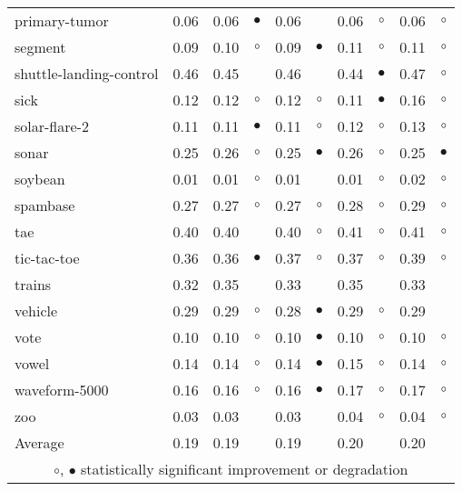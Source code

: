 {\begin{longtable}{lrr@{\hspace{0.1cm}}cr@{\hspace{0.1cm}}cr@{\hspace{0.1cm}}cr@{\hspace{0.1cm}}c}
primary-tumor & 0.06 & 0.06 &  $\bullet$ & 0.06 &            & 0.06 &   $\circ$ & 0.06 &   $\circ$\\
segment & 0.09 & 0.10 &    $\circ$ & 0.09 &  $\bullet$ & 0.11 &   $\circ$ & 0.11 &   $\circ$\\
shuttle-landing-control & 0.46 & 0.45 &            & 0.46 &            & 0.44 & $\bullet$ & 0.47 &   $\circ$\\
sick & 0.12 & 0.12 &    $\circ$ & 0.12 &    $\circ$ & 0.11 & $\bullet$ & 0.16 &   $\circ$\\
solar-flare-2 & 0.11 & 0.11 &  $\bullet$ & 0.11 &    $\circ$ & 0.12 &   $\circ$ & 0.13 &   $\circ$\\
sonar & 0.25 & 0.26 &    $\circ$ & 0.25 &  $\bullet$ & 0.26 &   $\circ$ & 0.25 & $\bullet$\\
soybean & 0.01 & 0.01 &    $\circ$ & 0.01 &            & 0.01 &   $\circ$ & 0.02 &   $\circ$\\
spambase & 0.27 & 0.27 &    $\circ$ & 0.27 &    $\circ$ & 0.28 &   $\circ$ & 0.29 &   $\circ$\\
tae & 0.40 & 0.40 &            & 0.40 &    $\circ$ & 0.41 &   $\circ$ & 0.41 &   $\circ$\\
tic-tac-toe & 0.36 & 0.36 &  $\bullet$ & 0.37 &    $\circ$ & 0.37 &   $\circ$ & 0.39 &   $\circ$\\
trains & 0.32 & 0.35 &            & 0.33 &            & 0.35 &           & 0.33 &          \\
vehicle & 0.29 & 0.29 &    $\circ$ & 0.28 &  $\bullet$ & 0.29 &   $\circ$ & 0.29 &          \\
vote & 0.10 & 0.10 &    $\circ$ & 0.10 &  $\bullet$ & 0.10 &   $\circ$ & 0.10 &   $\circ$\\
vowel & 0.14 & 0.14 &    $\circ$ & 0.14 &  $\bullet$ & 0.15 &   $\circ$ & 0.14 &   $\circ$\\
waveform-5000 & 0.16 & 0.16 &    $\circ$ & 0.16 &  $\bullet$ & 0.17 &   $\circ$ & 0.17 &   $\circ$\\
zoo & 0.03 & 0.03 &            & 0.03 &            & 0.04 &   $\circ$ & 0.04 &   $\circ$\\
\hline
Average & 0.19 & 0.19 &            & 0.19 &            & 0.20 &           & 0.20 &          \\
\hline
\multicolumn{10}{c}{$\circ$, $\bullet$ statistically significant improvement or degradation}\\
\end{longtable} \footnotesize \par}
